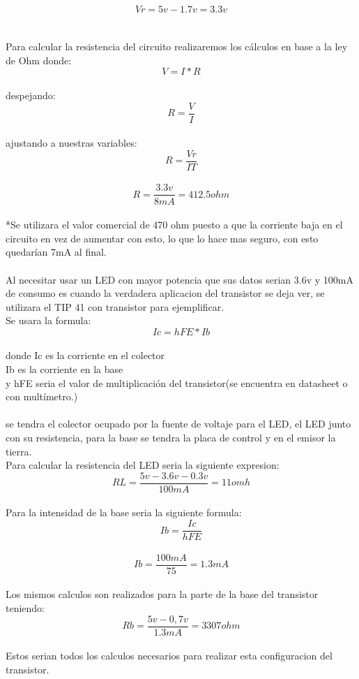 \documentclass[13pt]{article}
\begin{document}
$$Vr=5v-1.7v=3.3v$$\\\\
Para calcular la resistencia del circuito realizaremos los cálculos en base a la ley de Ohm donde:\\
$$V=I*R$$\\
despejando:\\
$$R=\frac{V}{I}$$\\
ajustando a nuestras variables:\\
$$R=\frac{Vr}{IT}$$\\
$$R=\frac{3.3v}{8mA}=412.5 ohm$$\\
*Se utilizara el valor comercial de 470 ohm puesto a que la corriente baja en el circuito en vez de aumentar con esto, lo que lo hace mas seguro, con esto quedarían 7mA al final.\\\\
Al necesitar usar un LED con mayor potencia que sus datos serian 3.6v y 100mA de consumo es cuando la verdadera aplicacion del transistor se deja ver, se utilizara el TIP 41 con transistor para ejemplificar.\\
Se usara la formula:\\
$$Ic=hFE*Ib$$\\
donde Ic es la corriente en el colector\\
Ib es la corriente en la base \\
y hFE seria el valor de multiplicación del transistor(se encuentra en datasheet o con multímetro.)\\\\
se tendra el colector ocupado por la fuente de voltaje para el LED, el LED junto con su resistencia, para la base se tendra la placa de control y en el emisor la tierra.\\
Para calcular la resistencia del LED seria la siguiente expresion:\\
$$RL=\frac{5v-3.6v-0.3v}{100mA}=11 omh$$\\
Para la intensidad de la base seria la siguiente formula:\\
$$Ib=\frac{Ic}{hFE}$$\\
$$Ib=\frac{100mA}{75}=1.3mA$$\\
Los mismos calculos son realizados para la parte de la base del transistor teniendo:\\
$$Rb=\frac{5v-0,7v}{1.3mA}=3307 ohm$$\\
Estos serian todos los calculos necesarios para realizar esta configuracion del transistor.\\
\end{document}

